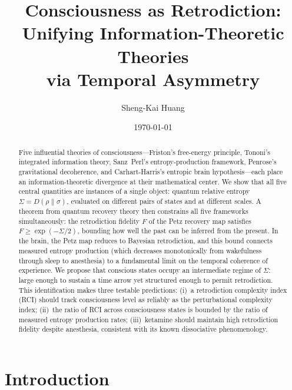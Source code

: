 \documentclass[prl,twocolumn,superscriptaddress,longbibliography,floatfix]{revtex4-2}
\begin{document}
\title{Consciousness as Retrodiction:\\
Unifying Information-Theoretic Theories\\
via Temporal Asymmetry}

\author{Sheng-Kai Huang}

\date{\today}

\begin{abstract}
Five influential theories of consciousness---Friston's free-energy
principle, Tononi's integrated information theory, Sanz~Perl's
entropy-production framework, Penrose's gravitational decoherence,
and Carhart-Harris's entropic brain hypothesis---each place an
information-theoretic divergence at their mathematical center.  We
show that all five central quantities are instances of a single
object: quantum relative entropy
$\Sigma = D(\rho\|\sigma)$, evaluated on different pairs of
states and at different scales.  A theorem from quantum recovery
theory then constrains all five frameworks simultaneously:
the retrodiction fidelity $F$ of the Petz recovery map satisfies
$F \geq \exp(-\Sigma/2)$, bounding how well the past can be
inferred from the present.  In the brain, the Petz map reduces
to Bayesian retrodiction, and this bound connects measured
entropy production (which decreases monotonically from wakefulness
through sleep to anesthesia) to a fundamental limit on the
temporal coherence of experience.  We propose that conscious states
occupy an intermediate regime of $\Sigma$: large enough to sustain
a time arrow yet structured enough to permit retrodiction.
This identification makes three testable predictions:
(i)~a retrodiction complexity index (RCI) should track
consciousness level as reliably as the perturbational complexity
index;
(ii)~the ratio of RCI across consciousness states is bounded by
the ratio of measured entropy production rates;
(iii)~ketamine should maintain high retrodiction fidelity
despite anesthesia, consistent with its known dissociative
phenomenology.
\end{abstract}

\maketitle

\section{Introduction}
\label{sec:intro}
\end{document}
